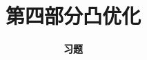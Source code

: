 



\title[Convex Optimization]{\LARGE \bfseries 第四部分\quad 凸优化} %
\author[Exercises] %
{\Large \bfseries 习题}
\date{}






\begin{frame}

\titlepage %

\end{frame}





